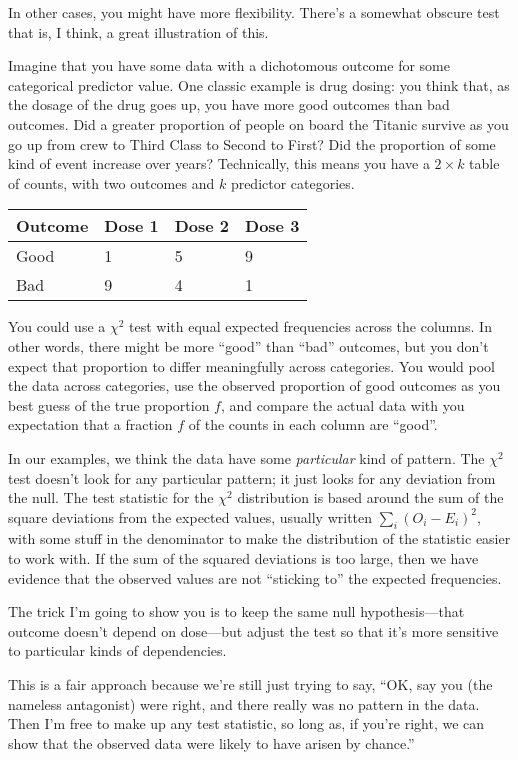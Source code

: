 \documentclass{book}
\begin{document}
In other cases, you might have more flexibility. There's a somewhat
obscure test that is, I think, a great illustration of this.

Imagine that you have some data with a dichotomous outcome for some
categorical predictor value. One classic example is drug dosing: you
think that, as the dosage of the drug goes up, you have more good
outcomes than bad outcomes. Did a greater proportion of people on board
the Titanic survive as you go up from crew to Third Class to Second to
First? Did the proportion of some kind of event increase over years?
Technically, this means you have a \(2 \times k\) table of counts, with
two outcomes and \(k\) predictor categories.

\begin{longtable}[]{@{}llll@{}}
\toprule
Outcome & Dose 1 & Dose 2 & Dose 3\tabularnewline
\midrule
\endhead
Good & 1 & 5 & 9\tabularnewline
Bad & 9 & 4 & 1\tabularnewline
\bottomrule
\end{longtable}

You could use a \(\chi^2\) test with equal expected frequencies across
the columns. In other words, there might be more ``good'' than ``bad''
outcomes, but you don't expect that proportion to differ meaningfully
across categories. You would pool the data across categories, use the
observed proportion of good outcomes as you best guess of the true
proportion \(f\), and compare the actual data with you expectation that
a fraction \(f\) of the counts in each column are ``good''.

In our examples, we think the data have some \emph{particular} kind of
pattern. The \(\chi^2\) test doesn't look for any particular pattern; it
just looks for any deviation from the null. The test statistic for the
\(\chi^2\) distribution is based around the sum of the square deviations
from the expected values, usually written \(\sum_i (O_i - E_i)^2\), with
some stuff in the denominator to make the distribution of the statistic
easier to work with. If the sum of the squared deviations is too large,
then we have evidence that the observed values are not ``sticking to''
the expected frequencies.

The trick I'm going to show you is to keep the same null
hypothesis---that outcome doesn't depend on dose---but adjust the test
so that it's more sensitive to particular kinds of dependencies.

This is a fair approach because we're still just trying to say, ``OK,
say you (the nameless antagonist) were right, and there really was no
pattern in the data. Then I'm free to make up any test statistic, so
long as, if you're right, we can show that the observed data were likely
to have arisen by chance.''
\end{document}
